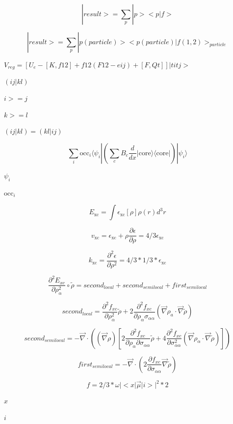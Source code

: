 \documentclass{article}
\begin{document}
\[
    | result > =  \sum_p | p > <p|f>
\]
\pagebreak

\[
|result> = \sum_p |p(particle)> <p(particle)|f(1,2)>_{particle}
\]
\pagebreak

$ V_{reg} = [ U_e - [K,f12] + f12(F12-eij) + [F,Qt] ]|titj> $
\pagebreak

$(ij|kl)$
\pagebreak

$i>=j$
\pagebreak

$k>=l$
\pagebreak

$(ij|kl)=(kl|ij)$
\pagebreak

\[
\sum_i \mathrm{occ}_i \langle \psi_i | \left( \sum_c B_c \frac{d}{dx} | \mathrm{core} \rangle \langle \mathrm{core} | \right) | \psi_i \rangle
\]
\pagebreak

$ \psi_i $
\pagebreak

$ \mathrm{occ}_i $
\pagebreak

\[
   E_\mathrm{xc} = \int\epsilon_\mathrm{xc}[\rho]\rho(r) d^3r
\]
\pagebreak

\[
   v_\mathrm{xc} = \epsilon_\mathrm{xc} + \rho\frac{\partial \epsilon}{\partial \rho}
                 = 4/3\epsilon_\mathrm{xc}
\]
\pagebreak

\[
   k_\mathrm{xc} = \frac{\partial^2\epsilon}{\partial \rho^2} = 4/3*1/3 * \epsilon_\mathrm{xc}
\]
\pagebreak

\[
  \frac{\partial^2E_{xc}}{\partial \rho_\alpha^2}\circ\tilde\rho
     = second_{local} + second_{semilocal} + first_{semilocal}
\]
\pagebreak

\[
       second_{local} = \frac{\partial^2 f_{xc}}{\partial \rho_\alpha^2}\tilde \rho
       + 2\frac{\partial^2 f_{xc}}{\partial \rho_\alpha\sigma_{\alpha\alpha}}
           \left(\vec\nabla \rho_a\cdot \vec \nabla\tilde\rho\right)
\]
\pagebreak

\[
     second_{semilocal} = -\vec\nabla\cdot\left((\vec\nabla\rho)
            \left[2\frac{\partial^2 f_{xc}}{\partial\rho_\alpha\partial\sigma_{\alpha\alpha}}\tilde\rho
            + 4\frac{\partial^2 f_{xc}}{\partial\sigma_{\alpha\alpha}^2}
               \left(\vec\nabla\rho_\alpha\cdot\vec\nabla\tilde\rho\right)\right]\right)
\]
\pagebreak

\[
     first_{semilocal} =
       -\vec\nabla\cdot\left(2\frac{\partial f_{xc}}{\partial\sigma_{\alpha\alpha}}\vec\nabla\tilde\rho\right)
\]
\pagebreak

\[
f = 2/3 * \omega |<x | \vec \mu | i >| ^2 * 2
\]
\pagebreak

$ x $
\pagebreak

$ i $
\pagebreak
\end{document}
